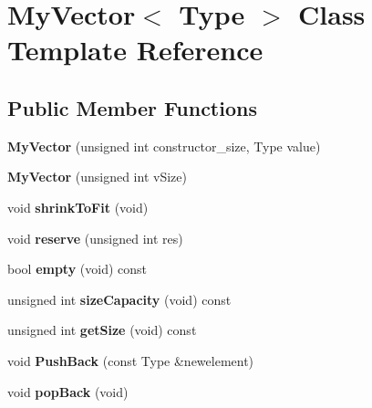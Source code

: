 \hypertarget{classMyVector}{}\section{My\+Vector$<$ Type $>$ Class Template Reference}
\label{classMyVector}
\subsection*{Public Member Functions}
\begin{DoxyCompactItemize}
\item 
\mbox{\label{classMyVector_a09a0a53d67528fc8cf7c75e50e666f3e}} 
{\bfseries My\+Vector} (unsigned int constructor\+\_\+size, Type value)
\item 
\mbox{\label{classMyVector_ad9150197d4f40893fc0694eab51dff3f}} 
{\bfseries My\+Vector} (unsigned int v\+Size)
\item 
\mbox{\label{classMyVector_abf42d6f142589ab76efd8e8050c2f12c}} 
void {\bfseries shrink\+To\+Fit} (void)
\item 
\mbox{\label{classMyVector_a8793cd4a1ec1df2104f20d7b3fda2c7a}} 
void {\bfseries reserve} (unsigned int res)
\item 
\mbox{\label{classMyVector_a9a4db5f7572c6dce12279a8ceb2798d5}} 
bool {\bfseries empty} (void) const
\item 
\mbox{\label{classMyVector_acf22be00b40145fef2f9dc7a63511995}} 
unsigned int {\bfseries size\+Capacity} (void) const
\item 
\mbox{\label{classMyVector_aa4f26bb090c1d23861811ea1983927f1}} 
unsigned int {\bfseries get\+Size} (void) const
\item 
\mbox{\label{classMyVector_a9e3b2952308f179196339693d16df039}} 
void {\bfseries Push\+Back} (const Type \&newelement)
\item 
\mbox{\label{classMyVector_aa666d4e5ec09b7360bd0ce830cd2fdeb}} 
void {\bfseries pop\+Back} (void)
\item 

\end{DoxyCompactItemize}

